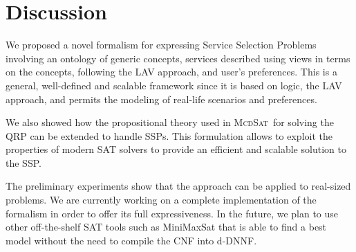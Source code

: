 \documentclass{llncs}
\newcommand{\mcdsat}{\textsc{McdSat}}
\begin{document}
\section{Discussion}

We proposed a novel formalism for expressing Service Selection Problems
involving an ontology of generic concepts, services described using views
in terms on the concepts, following the LAV approach, and user's preferences.
This is a general, well-defined and scalable framework since it is based
on logic, the LAV approach, and permits the modeling of real-life scenarios
and preferences.

We also showed how the propositional theory used in \mcdsat\ for solving
the QRP can be extended to handle SSPs.
This formulation allows to exploit the properties of modern SAT solvers
to provide an efficient and scalable solution to the SSP.

The preliminary experiments show that the approach can be applied to
real-sized problems. We are currently working on a complete implementation
of the formalism in order to offer its full expressiveness.
In the future, we plan to use other off-the-shelf SAT tools such 
as MiniMaxSat that is able to find a best model without the need 
to compile the CNF into d-DNNF.



\end{document}
